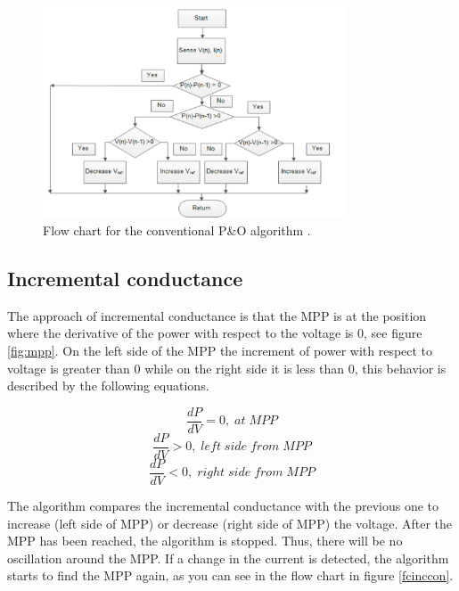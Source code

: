\begin{figure}[H]
	\begin{center}
		\includegraphics[width=0.8\textwidth]{../Pictures/P1/Flow_chart/flow_chart_perturb_observe}
		\caption{Flow chart for the conventional P\&O algorithm \cite{PerturbObserveFC}.}
		\label{fcperturbandobserve}
	\end{center}	
\end{figure}

\iffalse
\subsection{Incremental conductance}
The approach of incremental conductance is that the MPP is at the position where the derivative of the power with respect to the voltage is 0, see figure \ref{fig:mpp}. On the left side of the MPP the increment of power with respect to voltage is greater than 0 while on the right side it is less than 0, this behavior is described by the following equations. \cite{AN1521_MC}

\begin{equation} \label{Inccond1}
\frac{dP}{dV} = 0 ,\; at\; MPP 
\end{equation} 
\begin{equation} \label{Inccond2}
\frac{dP}{dV} > 0 ,\; left\; side\; from\; MPP 
\end{equation}
\begin{equation} \label{Inccond3}
\frac{dP}{dV} < 0 ,\; right\; side\; from\; MPP
\end{equation}

The algorithm compares the incremental conductance with the previous one to increase (left side of MPP) or decrease (right side of MPP) the voltage. After the MPP has been reached, the algorithm is stopped. Thus, there will be no oscillation around the MPP. If a change in the current is detected, the algorithm starts to find the MPP again, as you can see in the flow chart in figure \ref{fcinccon}. \cite{AN1521_MC}

